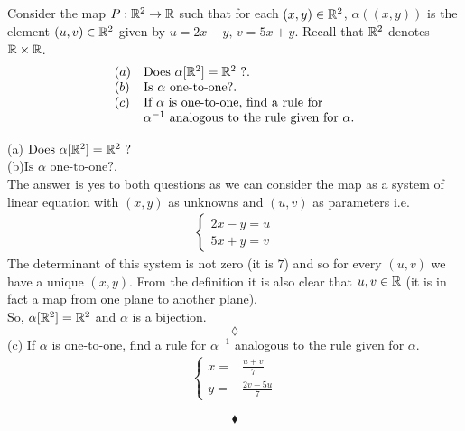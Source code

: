 \subsection{}
\begin{tcolorbox}
Consider the map $P:\mathbb{R}^2\rightarrow \mathbb{R}$ such that for each $(x,y)\in \mathbb{R}^2$, $\alpha\left((x,y)\right)$ is the element $(u,v)\in \mathbb{R}^2$ given by $u=2x-y,\, v= 5x+y$. Recall that $\mathbb{R}^2$ denotes $\mathbb{R}\times\mathbb{R}$.\\
\begin{align*}
\begin{array}{ll}
(a)&\text{Does }\alpha[\mathbb{R}^2] = \mathbb{R}^2\text{ ?}.\\
(b)&\text{Is }\alpha\text{ one-to-one?}.\\
(c)&\text{If }\alpha\text{ is one-to-one, find a rule for }\\
&\alpha^{-1} \text{ analogous to the rule given for }\alpha.
\end{array}
\end{align*} 
\end{tcolorbox}
$$ $$ 
(a)$ \text{ Does }\alpha[\mathbb{R}^2] = \mathbb{R}^2\text{ ?}$\\
(b)$\text{Is }\alpha\text{ one-to-one?}$.\\
The answer is yes to both questions as we can consider the map as a system of linear equation with $(x,y)$ as unknowns and $(u,v)$ as parameters i.e.
\begin{align*}
\left\{\begin{matrix}
2x-y=u\\ 5x+y=v
\end{matrix}\right.
\end{align*}
 The determinant of this system is not zero (it is $7$) and so for every $(u,v)$ we have a unique $(x,y)$. From the definition it is also clear that $u,v\in \mathbb{R}$ (it is in fact a map from one plane to another plane).\\
  So, $\alpha[\mathbb{R}^2] = \mathbb{R}^2$ and $\alpha$ is a bijection.
  $$\lozenge$$
 (c) If $\alpha$ is one-to-one, find a rule for $\alpha^{-1}$  analogous to the rule given for $\alpha$.
 \begin{align*}
\left\{\begin{matrix}
x=& \frac{u+v}{7}\\ y=& \frac{2v-5u}{7}
\end{matrix}\right.
\end{align*}

$$\blacklozenge$$

